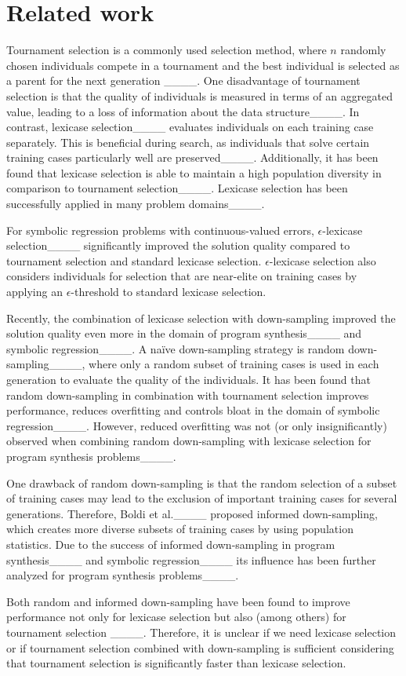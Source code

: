 \section{Related work}
\label{sec:related_work}

Tournament selection is a commonly used selection method, where $n$ randomly chosen individuals compete in a tournament and the best individual is selected as a parent for the next generation ____. One disadvantage of tournament selection is that the quality of individuals is measured in terms of an aggregated value, leading to a loss of information about the data structure____. In contrast, lexicase selection____ evaluates individuals on each training case separately. This is beneficial during search, as individuals that solve certain training cases particularly well are preserved____. Additionally, it has been found that lexicase selection is able to maintain a high population diversity in comparison to tournament selection____. Lexicase selection has been successfully applied in many problem domains____. 

For symbolic regression problems with continuous-valued errors, $\epsilon$-lexicase selection____ significantly improved the solution quality compared to tournament selection and standard lexicase selection. $\epsilon$-lexicase selection also considers individuals for selection that are near-elite on training cases by applying an $\epsilon$-threshold to standard lexicase selection.

Recently, the combination of lexicase selection with down-sampling improved the solution quality even more in the domain of program synthesis____ and symbolic regression____. A na\"ive down-sampling strategy is random down-sampling____, where only a random subset of training cases is used in each generation to evaluate the quality of the individuals.
It has been found that random down-sampling in combination with tournament selection improves performance, reduces overfitting and controls bloat in the domain of symbolic regression____. However, reduced overfitting was not (or only insignificantly) observed when combining random down-sampling with lexicase selection for program synthesis problems____.

One drawback of random down-sampling is that the random selection of a subset of training cases may lead to the exclusion of important training cases for several generations. Therefore, Boldi et al.____ proposed informed down-sampling, which creates more diverse subsets of training cases by using population statistics. Due to the success of informed down-sampling in program synthesis____ and symbolic regression____ its influence has been further analyzed for program synthesis problems____.

Both random and informed down-sampling have been found to improve performance not only for lexicase selection but also (among others) for tournament selection ____.
Therefore, it is unclear if we need lexicase selection or if tournament selection combined with down-sampling is sufficient considering that tournament selection is significantly faster than lexicase selection.
